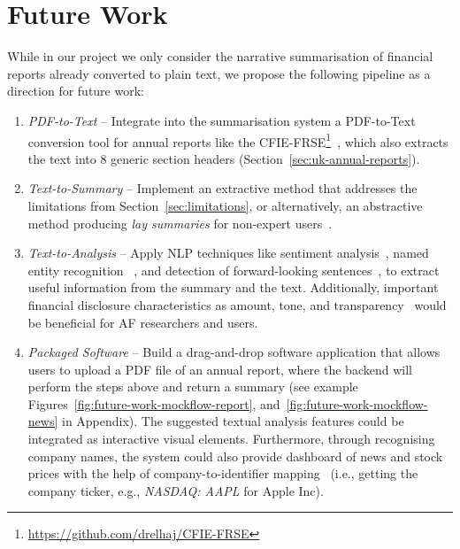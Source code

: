 \section{Future Work}\label{sec:future-work}
While in our project we only consider the narrative summarisation of
financial reports already converted to plain text, we propose the following pipeline as a direction for future work:
\begin{enumerate}
    \item \emph{PDF-to-Text} -- Integrate into the summarisation system a PDF-to-Text conversion tool for annual
    reports like the CFIE-FRSE\footnote{\url{https://github.com/drelhaj/CFIE-FRSE}}~\cite{elhaj2019multilingual}, which
    also extracts the text into 8 generic section headers (Section~\ref{sec:uk-annual-reports}).
    \item \emph{Text-to-Summary} -- Implement an extractive method that addresses the limitations from Section~\ref{sec:limitations},
    or alternatively, an abstractive method producing \emph{lay summaries} for non-expert users~\cite{vinzelberg2023lay, Guo2020AutomatedLL}.
    \item \emph{Text-to-Analysis} -- Apply NLP techniques like sentiment analysis~\cite{araci2019finbert}, named entity recognition
   ~\cite{zhang2022finbertmrc}, and detection of forward-looking sentences~\cite{stihec-etal-2021-preliminary},
    to extract useful information from the summary and the text.
    Additionally, important financial disclosure characteristics as amount, tone, and transparency~\cite{li2010textual, Li2011TextualAO}
    would be beneficial for AF researchers and users.
    \item \emph{Packaged Software} -- Build a drag-and-drop software application that allows users to upload a PDF file of an
    annual report, where the backend will perform the steps above and return a summary
    (see example Figures~\ref{fig:future-work-mockflow-report}, and~\ref{fig:future-work-mockflow-news} in Appendix).
    The suggested textual analysis features could be integrated as interactive visual elements.
    Furthermore, through recognising company names, the system could also provide dashboard of news and stock prices
    with the help of company-to-identifier mapping~\cite{el-haj2019retrieving}
    (i.e., getting the company ticker, e.g., \emph{NASDAQ: AAPL} for Apple Inc).
\end{enumerate}